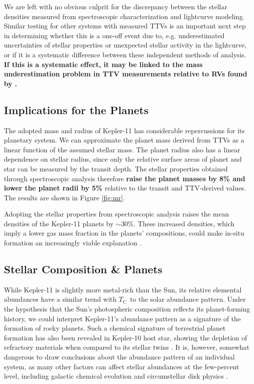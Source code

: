 \documentclass[twocolumn]{aastex61}
\newcommand{\tc}{$T_\mathrm{C}$}
\begin{document}
We are left with no obvious culprit for the discrepancy between the stellar densities measured from spectroscopic characterization and lightcurve modeling. Similar testing for other systems with measured TTVs is an important next step in determining whether this is a one-off event due to, e.g. underestimated uncertainties of stellar properties or unexpected stellar activity in the lightcurve, or if it is a systematic difference between these independent methods of analysis. \textbf{If this is a systematic effect, it may be linked to the mass underestimation problem in TTV measurements relative to RVs found by \citet{Weiss2014}.}

\subsection{Implications for the Planets}

The adopted mass and radius of Kepler-11 has considerable repercussions for its planetary system. We can approximate the planet mass derived from TTVs as a linear function of the assumed stellar mass. The planet radius also has a linear dependence on stellar radius, since only the relative surface areas of planet and star can be measured by the transit depth. The stellar properties obtained through spectroscopic analysis therefore \textbf{raise the planet masses by 8\% and lower the planet radii by 5\%} relative to the transit and TTV-derived values. The results are shown in Figure \ref{fig:mr}.

Adopting the stellar properties from spectroscopic analysis raises the mean densities of the Kepler-11 planets by $\sim$30\%. These increased densities, which imply a lower gas mass fraction in the planets' compositions, could make in-situ formation an increasingly viable explanation \citep[see e.g.][]{Lee2014}.

\subsection{Stellar Composition \& Planets}

While Kepler-11 is slightly more metal-rich than the Sun, its relative elemental abundances have a similar trend with \tc\ to the solar abundance pattern. Under the \citet{Melendez2009} hypothesis that the Sun's photospheric composition reflects its planet-forming history, we could interpret Kepler-11's abundance pattern as a signature of the formation of rocky planets. Such a chemical signature of terrestrial planet formation has also been revealed in Kepler-10 host star, showing the depletion of refractory materials when compared to its stellar twins \citep{Liu2016}. It is, however, somewhat dangerous to draw conclusions about the abundance pattern of an individual system, as many other factors can affect stellar abundances at the few-percent level, including galactic chemical evolution and circumstellar disk physics \citep{Gaidos2015}.
\end{document}
